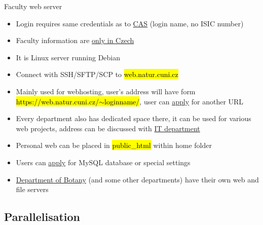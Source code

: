 \documentclass[compress, ucs, xelatex, 11pt, xcolor=svgnames, aspectratio=169,
	hyperref={
		bookmarks=true,
		unicode=true,
		colorlinks=true,
		pdftitle={Linux, command line and MetaCentrum},
		plainpages=false,
		pdfauthor={Vojtech Zeisek},
		pdfsubject={Course about use of Linux command line, writing shell scripts and using MetaCentrum of CESNET},
		pdfcreator={XeLaTeX},
		pdfkeywords={Linux, GNU, BASH, shell, command line, MetaCentrum},
		linkcolor=DarkRed, %
		anchorcolor=DarkBlue, %
		citecolor=Indigo, %
		filecolor=NavyBlue, %
		menucolor=DarkMagenta, %
		urlcolor=DarkBlue, %
		pdftex},
	url={hyphens, lowtilde} %
	]{beamer}
\renewcommand{\texttt}[1]{\hl{\ttfamily #1}}
\begin{document}
\begin{frame}{Faculty web server}
	\begin{itemize}
		\item Login requires same credentials as to \href{https://cas.cuni.cz/}{CAS} (login name, no ISIC number)
		\item Faculty information are \href{https://www.natur.cuni.cz/fakulta/cit/web-aplikace/webhosting}{only in Czech}
		\item It is Linux server running Debian
		\item Connect with SSH/SFTP/SCP to \texttt{web.natur.cuni.cz}
		\item Mainly used for webhosting, user's address will have form \texttt{https://web.natur.cuni.cz/$\sim$loginname/}, user can \href{https://helpdesk.natur.cuni.cz/servlet/HelpdeskDynamic?eid=Rozcestnik}{apply} for another URL
		\item Every department also has dedicated space there, it can be used for various web projects, address can be discussed with \href{https://www.natur.cuni.cz/fakulta/cit/lide}{IT department}
		\item Personal web can be placed in \texttt{public\_html} within home folder
		\item Users can \href{https://helpdesk.natur.cuni.cz/servlet/HelpdeskDynamic?eid=Rozcestnik}{apply} for MySQL database or special settings
		\item \href{https://www.natur.cuni.cz/biology/botany/working-information/servers-webs-computers/}{Department of Botany} (and some other departments) have their own web and file servers
	\end{itemize}
\end{frame}

\subsection{Parallelisation}
\end{document}
